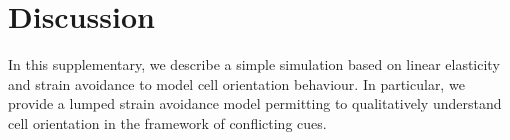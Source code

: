 \documentclass[11pt]{amsart}
\begin{document}
\begin{figure}
\end{figure}


\section{Discussion}

In this supplementary, we describe a simple simulation based on linear elasticity and strain avoidance to model cell orientation behaviour. In particular, we provide a lumped strain avoidance model permitting to qualitatively understand cell orientation in the framework of conflicting cues.
\end{document}
